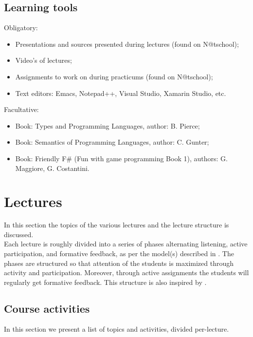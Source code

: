 \documentclass[a4paper, 10pt]{article}
\begin{document}
	\subsection{Learning tools}
		Obligatory:
		\begin{itemize}
			\item Presentations and sources presented during lectures (found on N@tschool);
			\item Video's of lectures;
			\item Assignments to work on during practicums (found on N@tschool);
			\item Text editors: Emacs, Notepad++, Visual Studio, Xamarin Studio, etc.
		\end{itemize}
		Facultative:
		\begin{itemize}
			\item Book: Types and Programming Languages, author: B. Pierce;
			\item Book: Semantics of Programming Languages, author: C. Gunter;
			\item Book: Friendly F\# (Fun with game programming Book 1), authors: G. Maggiore, G. Costantini.
		\end{itemize}

\newpage
\section{Lectures}
	In this section the topics of the various lectures and the lecture structure is discussed. \\
	Each lecture is roughly divided into a series of phases alternating listening, active participation, and formative feedback, as per the model(s) described in \cite{deeFink, berkelBax}. The phases are structured so that attention of the students is maximized through activity and participation. Moreover, through active assignments the students will regularly get formative feedback. This structure is also inspired by \cite{tenEasyWays}. \\
		

	\subsection{Course activities}
		In this section we present a list of topics and activities, divided per-lecture. \\
				
\end{document}
